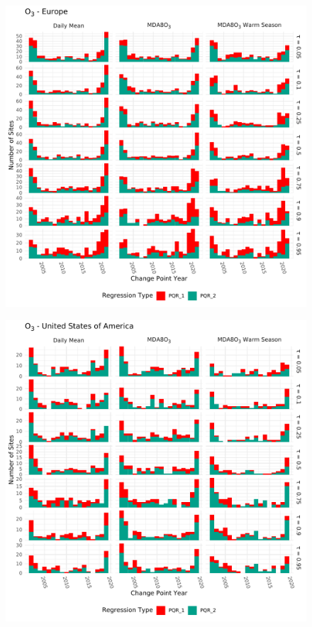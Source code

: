 \documentclass{article}
\begin{document}
\begin{figure}[p]
\centering
\includegraphics[width=\linewidth]{figures/si_figures/cp_year/cp_year_o3_Europe.pdf}
\caption{}
\label{si_fig:cp_year_eu}
\end{figure}
\clearpage

\begin{figure}[p]
\centering
\includegraphics[width=\linewidth]{figures/si_figures/cp_year/cp_year_o3_United-States-of-America.pdf}
\caption{}
\label{si_fig:cp_year_usa}
\end{figure}
\clearpage
\end{document}

